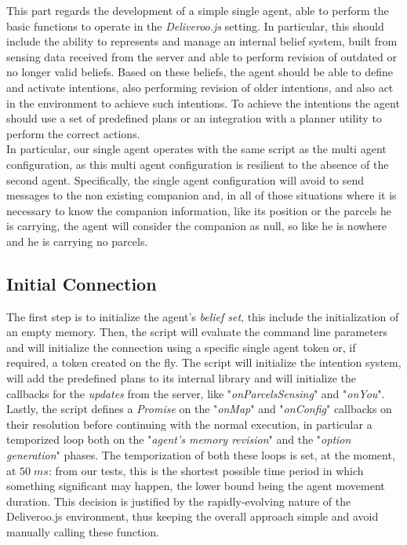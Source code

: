     This part regards the development of a simple single agent, able to perform the basic functions to operate in the \textit{Deliveroo.js} setting. In particular, this should include the ability to represents and manage an internal belief system, built from sensing data received from the server and able to perform revision of outdated or no longer valid beliefs. Based on these beliefs, the agent should be able to define and activate  intentions, also performing revision of older intentions, and also act in the environment to achieve such intentions. To achieve the intentions the agent should use a set of predefined plans or an integration with a planner utility to perform the correct actions.
    \medskip\\    
    In particular, our single agent operates with the same script as the multi agent configuration, as this multi agent configuration is resilient to the absence of the second agent. Specifically, the single agent configuration will avoid to send messages to the non existing companion and, in all of those situations where it is necessary to know the companion information, like its position or the parcels he is carrying, the agent will consider the companion as null, so like he is nowhere and he is carrying no parcels.

    \subsection{Initial Connection}
        The first step is to initialize the agent's \textit{belief set}, this include the initialization of an empty memory. Then, the script will evaluate the command line parameters and will initialize the connection using a specific single agent token or, if required, a token created on the fly. The script will initialize the intention system, will add the predefined plans to its internal library and will initialize the callbacks for the \textit{updates} from the server, like "\textit{onParcelsSensing}" and "\textit{onYou}". Lastly, the script defines a \textit{Promise} on the "\textit{onMap}" and "\textit{onConfig}" callbacks on their resolution before continuing with the normal execution, in particular a temporized loop both on the "\textit{agent's memory revision}" and the "\textit{option generation}" phases. The temporization of both these loops is set, at the moment, at $50\;ms$: from our tests, this is the shortest possible time period in which something significant may happen, the lower bound being the agent movement duration. This decision is justified by the rapidly-evolving nature of the Deliveroo.js environment, thus keeping the overall approach simple and avoid manually calling these function.

